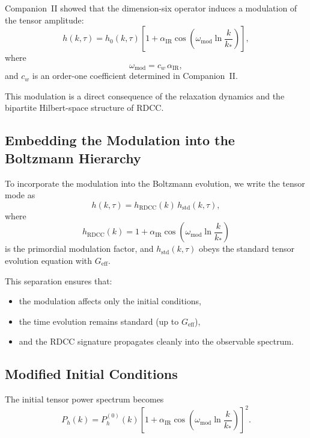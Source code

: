 \documentclass[11pt,a4paper]{article}
\begin{document}
Companion~II showed that the dimension-six operator induces a modulation of the tensor
amplitude:
\begin{equation}
    h(k,\tau)
    = h_{0}(k,\tau)\left[1 + \alpha_{\mathrm{IR}}
      \cos\!\left(\omega_{\mathrm{mod}}\ln\frac{k}{k_{\ast}}\right)\right],
\end{equation}
where
\begin{equation}
    \omega_{\mathrm{mod}} = c_{w}\,\alpha_{\mathrm{IR}},
\end{equation}
and $c_{w}$ is an order-one coefficient determined in Companion~II.

This modulation is a direct consequence of the relaxation dynamics and the bipartite
Hilbert-space structure of RDCC.

\subsection{Embedding the Modulation into the Boltzmann Hierarchy}

To incorporate the modulation into the Boltzmann evolution, we write the tensor mode as
\begin{equation}
    h(k,\tau) = h_{\mathrm{RDCC}}(k)\,h_{\mathrm{std}}(k,\tau),
\end{equation}
where
\begin{equation}
    h_{\mathrm{RDCC}}(k)
    = 1 + \alpha_{\mathrm{IR}}
      \cos\!\left(\omega_{\mathrm{mod}}\ln\frac{k}{k_{\ast}}\right)
\end{equation}
is the primordial modulation factor, and $h_{\mathrm{std}}(k,\tau)$ obeys the standard tensor
evolution equation with $G_{\mathrm{eff}}$.

This separation ensures that:
\begin{itemize}
    \item the modulation affects only the initial conditions,
    \item the time evolution remains standard (up to $G_{\mathrm{eff}}$),
    \item and the RDCC signature propagates cleanly into the observable spectrum.
\end{itemize}

\subsection{Modified Initial Conditions}

The initial tensor power spectrum becomes
\begin{equation}
    P_{h}(k)
    = P_{h}^{(0)}(k)\left[1 + \alpha_{\mathrm{IR}}
      \cos\!\left(\omega_{\mathrm{mod}}\ln\frac{k}{k_{\ast}}\right)\right]^{2}.
\end{equation}
\end{document}
